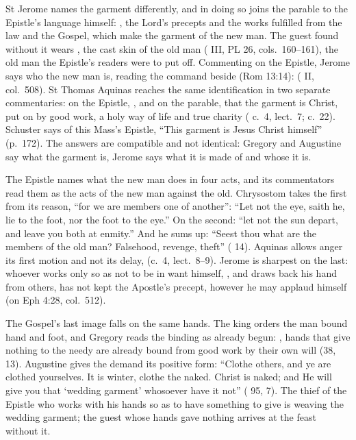 St Jerome names the garment differently, and in doing so joins the parable to
the Epistle's language himself: , the Lord's precepts and the works fulfilled from the law and the
Gospel, which make the garment of the new man. The guest found without it wears
, the cast skin of the old man ( III, PL 26, cols.~160--161), the old man the Epistle's readers were to
put off. Commenting on the Epistle, Jerome says who the new man is, reading the
command beside  (Rom 13:14): 
( II, col.~508). St Thomas Aquinas reaches the
same identification in two separate commentaries: on the Epistle,
, and on the
parable, that the garment is Christ, put on by good work, a holy way of life and
true charity ( c.~4, lect.~7;  c.~22). Schuster says of this Mass's Epistle, ``This garment is Jesus
Christ himself'' (p.~172). The answers are compatible and not identical:
Gregory and Augustine say what the garment is, Jerome says what it is made of
and whose it is.

The Epistle names what the new man does in four acts, and its commentators read
them as the acts of the new man against the old. Chrysostom takes the first from its reason, ``for we are
members one of another'': ``Let not the eye, saith he, lie to the foot, nor the
foot to the eye.'' On the second: ``let not the sun depart, and leave you both
at enmity.'' And he sums up: ``Seest thou what are the members of the old man?
Falsehood, revenge, theft'' ( 14). Aquinas allows
anger its first motion and not its delay, 
(c.~4, lect.~8--9). Jerome is sharpest on the last: whoever works only so as not to be in
want himself, , and draws back his hand
from others, has not kept the Apostle's precept, however he may applaud himself
(on Eph 4:28, col.~512).

The Gospel's last image falls on the same hands. The king orders the man bound
hand and foot, and Gregory reads the binding as already begun: , hands
that give nothing to the needy are already bound from good work by their own
will (38, 13). Augustine gives the demand its positive form: ``Clothe others,
and ye are clothed yourselves. It is winter, clothe the naked. Christ is naked;
and He will give you that `wedding garment' whosoever have it not''
( 95, 7). The thief of the Epistle who works with his hands so as to
have something to give is weaving the wedding garment; the guest whose hands
gave nothing arrives at the feast without it.

